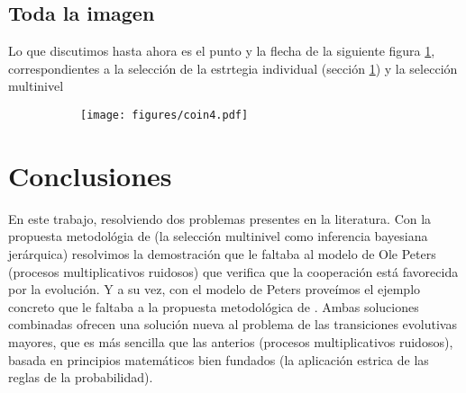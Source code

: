 \documentclass[a4paper,10pt]{article}
\begin{document}
\begin{figure}[H]
\centering
{}
\caption{}
\label{fig:modelo_grafico}
\end{figure}




\subsection{Toda la imagen}

Lo que discutimos hasta ahora es el punto y la flecha de la siguiente figura \ref{}, correspondientes a la selección de la estrtegia individual (sección \ref{}) y la selección multinivel 


\begin{figure}[H]
    \centering
    \begin{subfigure}[b]{0.66\textwidth}
    \texttt{[image: figures/coin4.pdf]}
    \end{subfigure}
    \caption{}
    \label{fig:fitness_temporal}
\end{figure}




\section{Conclusiones}

En este trabajo, resolviendo dos problemas presentes en la literatura.
Con la propuesta metodológia de \cite{czegel2019-bayesianEvolution} (la selección multinivel como inferencia bayesiana jerárquica) resolvimos la demostración que le faltaba al modelo de Ole Peters (procesos multiplicativos ruidosos) que verifica que la cooperación está favorecida por la evolución.
Y a su vez, con el modelo de Peters proveímos el ejemplo concreto que le faltaba a la propuesta metodológica de \cite{czegel2019-bayesianEvolution}.
Ambas soluciones combinadas ofrecen una solución nueva al problema de las transiciones evolutivas mayores, que es más sencilla que las anterios (procesos multiplicativos ruidosos), basada en principios matemáticos bien fundados (la aplicación estrica de las reglas de la probabilidad).
\end{document}
